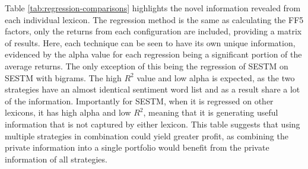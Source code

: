 Table \ref{tab:regression-comparisons} highlights the novel information revealed from each individual lexicon. The regression method is the same as calculating the FF5 factors, only the returns from each configuration are included, providing a matrix of results. Here, each technique can be seen to have its own unique information, evidenced by the alpha value for each regression being a significant portion of the average returns. The only exception of this being the regression of SESTM on SESTM with bigrams. The high $R^2$ value and low alpha is expected, as the two strategies have an almost identical sentiment word list and as a result share a lot of the information. Importantly for SESTM, when it is regressed on other lexicons, it has high alpha and low $R^2$, meaning that it is generating useful information that is not captured by either lexicon. This table suggests that using multiple strategies in combination could yield greater profit, as combining the private information into a single portfolio would benefit from the private information of all strategies.






